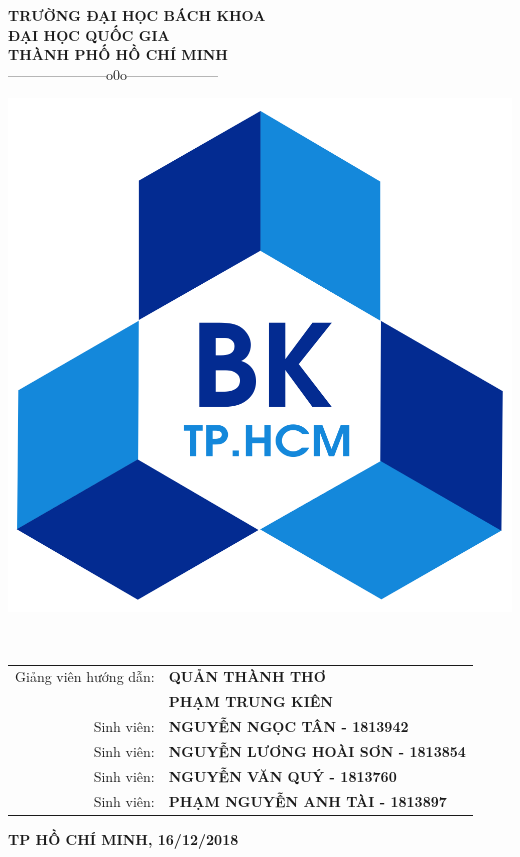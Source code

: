 \documentclass[12pt,a4paper]{report}
\begin{document}
\fontsize{13pt}{18pt}\selectfont %

\setlength{\baselineskip}{18truept}

\begin{titlepage} %

\begin{center}

{\large\bf TRƯỜNG ĐẠI HỌC BÁCH KHOA }\\
{\large\bf ĐẠI HỌC QUỐC GIA }\\
{\large\bf THÀNH PHỐ HỒ CHÍ MINH }\\

{———————o0o——————–}

\vskip 1cm



	\includegraphics[width=0.3\linewidth]{logg}

	\label{fig:logg}


\vskip 1cm

{\Large\bf \textbf{\color{blue}{BÁO CÁO BÀI TẬP LỚN NHẬP MÔN ĐIỆN TOÁN}}}\\

\vskip 1cm

{\bf {\it \color{blue}{Nhóm:}} \color{blue}{NHÓM 1 }} \hspace{0.5cm} {\bf {\it \color{blue}{Lớp:}} \color{blue}{L10}}

\vskip 3cm

\begin{tabular}{r l}

Giảng viên hướng dẫn:&{\bf QUẢN THÀNH THƠ }\\ &{\bf PHẠM TRUNG KIÊN}\\
[0.5cm]

Sinh viên:&{\bf NGUYỄN NGỌC TÂN - 1813942}\\
Sinh viên:&{\bf NGUYỄN LƯƠNG HOÀI SƠN - 1813854}\\
Sinh viên:&{\bf NGUYỄN VĂN QUÝ - 1813760}\\
Sinh viên:&{\bf PHẠM NGUYỄN ANH TÀI - 1813897}\\
[0.5cm]



\end{tabular}

\vfill

{\bf TP HỒ CHÍ MINH, 16/12/2018}

\end{center}

\end{titlepage}
\end{document}
